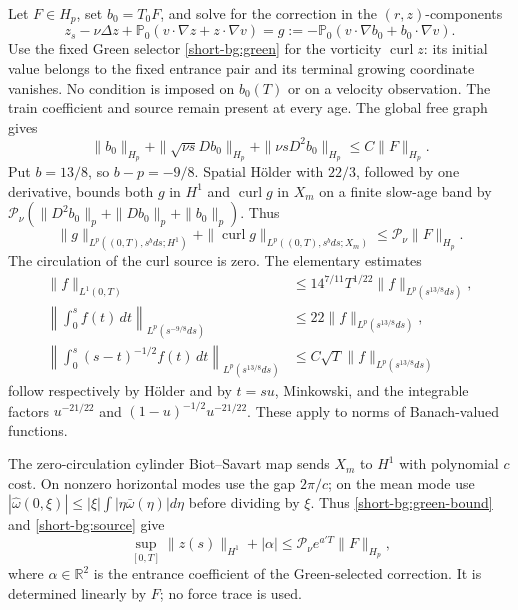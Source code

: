 Let $F\in H_p$, set $b_0=T_0F$, and solve for the correction in the $(r,z)$-components
\begin{equation}
 z_s-\nu\Delta z+\mathbb P_0(v\cdot\nabla z+z\cdot\nabla v)
     =g:=-\mathbb P_0(v\cdot\nabla b_0+b_0\cdot\nabla v).
 \label{short-bg:body-eq}
\end{equation}
Use the fixed Green selector \eqref{short-bg:green} for the vorticity
$\operatorname{curl}z$: its initial value belongs to the fixed entrance
pair and its terminal growing coordinate vanishes. No condition is
imposed on $b_0(T)$ or on a velocity observation. The train coefficient
and source remain present at every age. The global free graph gives
\[
 \|b_0\|_{H_p}+\|\sqrt{\nu s}Db_0\|_{H_p}
                    +\|\nu sD^2b_0\|_{H_p}\le C\|F\|_{H_p}.
\]
Put $b=13/8$, so $b-p=-9/8$. Spatial H\"older with $22/3$,
followed by one derivative, bounds both $g$ in $H^1$ and
$\operatorname{curl}g$ in $X_m$ on a finite slow-age band by
$\mathcal P_\nu(\|D^2b_0\|_p+\|Db_0\|_p+\|b_0\|_p)$.
Thus
\begin{equation}
 \|g\|_{L^p((0,T),s^bds;H^1)}
 +\|\operatorname{curl}g\|_{L^p((0,T),s^bds;X_m)}
 \le\mathcal P_\nu\|F\|_{H_p}.
 \label{short-bg:source}
\end{equation}
The circulation of the curl source is zero. The elementary estimates
\begin{align}
 \|f\|_{L^1(0,T)}&\le14^{7/11}T^{1/22}
                        \|f\|_{L^p(s^{13/8}ds)},\\
 \left\|\int_0^s f(t)\,dt\right\|_{L^p(s^{-9/8}ds)}
          &\le22\|f\|_{L^p(s^{13/8}ds)},\\
 \left\|\int_0^s(s-t)^{-1/2}f(t)\,dt\right\|_{L^p(s^{13/8}ds)}
          &\le C\sqrt T\|f\|_{L^p(s^{13/8}ds)}
 \label{short-bg:hardy}
\end{align}
follow respectively by H\"older and by $t=su$, Minkowski, and the
integrable factors $u^{-21/22}$ and
$(1-u)^{-1/2}u^{-21/22}$. These apply to norms of Banach-valued
functions.

The zero-circulation cylinder Biot--Savart map sends $X_m$ to $H^1$
with polynomial $c$ cost. On nonzero horizontal modes use the gap
$2\pi/c$; on the mean mode use
$|\widehat\omega(0,\xi)|\le|\xi|\int|\eta\bar\omega(\eta)|d\eta$
before dividing by $\xi$. Thus \eqref{short-bg:green-bound} and
\eqref{short-bg:source} give
\begin{equation}
 \sup_{[0,T]}\|z(s)\|_{H^1}+|\alpha|
 \le\mathcal P_\nu e^{a'T}\|F\|_{H_p},
 \label{short-bg:early}
\end{equation}
where $\alpha\in\mathbb R^2$ is the entrance coefficient of the
Green-selected correction. It is determined linearly by $F$; no force
trace is used.

